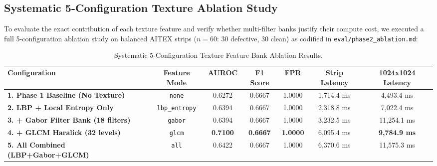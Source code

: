 \documentclass[10pt,a4paper]{article}
\begin{document}
\subsection{Systematic 5-Configuration Texture Ablation Study}
To evaluate the exact contribution of each texture feature and verify whether multi-filter banks justify their compute cost, we executed a full 5-configuration ablation study on balanced AITEX strips ($n = 60$: 30 defective, 30 clean) as codified in \texttt{eval/phase2\_ablation.md}:

\begin{table}[htbp]
\centering
\small
\begin{tabularx}{\textwidth}{l c c c c c c}
\toprule
\textbf{Configuration} & \textbf{Feature Mode} & \textbf{AUROC} & \textbf{F1 Score} & \textbf{FPR} & \textbf{Strip Latency} & \textbf{1024x1024 Latency} \\
\midrule
\textbf{1. Phase 1 Baseline (No Texture)} & \texttt{none} & 0.6272 & 0.6667 & 1.0000 & 1,714.4 ms & 4,493.4 ms \\
\textbf{2. LBP + Local Entropy Only} & \texttt{lbp\_entropy} & 0.6394 & 0.6667 & 1.0000 & 2,318.8 ms & 7,022.4 ms \\
\textbf{3. + Gabor Filter Bank (18 filters)} & \texttt{gabor} & 0.6394 & 0.6667 & 1.0000 & 3,232.5 ms & 11,254.1 ms \\
\textbf{4. + GLCM Haralick (32 levels)} & \texttt{glcm} & \textbf{0.7100} & \textbf{0.6667} & \textbf{1.0000} & 6,095.4 ms & \textbf{9,784.9 ms} \\
\textbf{5. All Combined (LBP+Gabor+GLCM)} & \texttt{all} & 0.6422 & 0.6667 & 1.0000 & 6,370.6 ms & 11,575.3 ms \\
\bottomrule
\end{tabularx}
\caption{Systematic 5-Configuration Texture Feature Bank Ablation Results.}
\label{tab:ablation}
\end{table}
\end{document}
